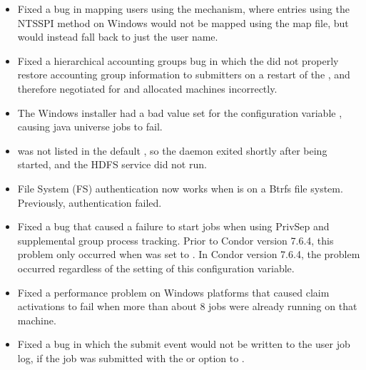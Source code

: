 \begin{itemize}



\item Fixed a bug in mapping users using the 
mechanism, where entries using the NTSSPI method on Windows would not be mapped
using the map file, but would instead fall back to just the user name.

\item Fixed a hierarchical accounting groups bug in which
the  did not properly restore accounting group 
information to submitters on a restart of the ,
and therefore negotiated for and allocated machines incorrectly.

\item The Windows installer had a bad value set for the configuration variable
, causing java universe jobs to fail. 

\item {} was not listed in the default
, so the  daemon exited
shortly after being started,
and the HDFS service did not run.

\item File System (FS) authentication now works when  
is on a Btrfs file system.  Previously, authentication failed.

\item Fixed a bug that caused a failure to start jobs when using PrivSep
and supplemental group process tracking.  
Prior to Condor version 7.6.4, this problem
only occurred when  was set
to .  
In Condor version 7.6.4, the problem occurred regardless of the setting
of this configuration variable.

\item Fixed a performance problem on Windows platforms
that caused claim activations to
fail when more than about 8 jobs were already running on that machine.

\item Fixed a bug in which the submit event would not be written to the user
job log,
if the job was submitted with the  or  option to
.


\end{itemize}
